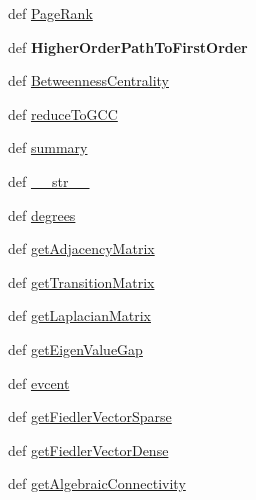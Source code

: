 \begin{DoxyCompactItemize}
\item 
def \hyperlink{classpathpy_1_1HigherOrderNetwork_1_1HigherOrderNetwork_abc76633f53a0747353e7ab0e15744d94}{Page\-Rank}
\item 
\hypertarget{classpathpy_1_1HigherOrderNetwork_1_1HigherOrderNetwork_ab71b78f1c9ffe7a06364841572f1fee2}{def {\bfseries Higher\-Order\-Path\-To\-First\-Order}}\label{classpathpy_1_1HigherOrderNetwork_1_1HigherOrderNetwork_ab71b78f1c9ffe7a06364841572f1fee2}

\item 
def \hyperlink{classpathpy_1_1HigherOrderNetwork_1_1HigherOrderNetwork_afcfdcfacef4f3beb7594a58600e833e4}{Betweenness\-Centrality}
\item 
def \hyperlink{classpathpy_1_1HigherOrderNetwork_1_1HigherOrderNetwork_a4b71eed8268df33814725ae7832729e6}{reduce\-To\-G\-C\-C}
\item 
def \hyperlink{classpathpy_1_1HigherOrderNetwork_1_1HigherOrderNetwork_ab35dd7f65e3bfeb280fcd38c1e7448f7}{summary}
\item 
def \hyperlink{classpathpy_1_1HigherOrderNetwork_1_1HigherOrderNetwork_a4aec883869195967a9209655905ace52}{\-\_\-\-\_\-str\-\_\-\-\_\-}
\item 
def \hyperlink{classpathpy_1_1HigherOrderNetwork_1_1HigherOrderNetwork_acd9ab003f80216ed6beff9c513a7e876}{degrees}
\item 
def \hyperlink{classpathpy_1_1HigherOrderNetwork_1_1HigherOrderNetwork_a8e10f45369dff5f7ccff3bcf7e6c5b33}{get\-Adjacency\-Matrix}
\item 
def \hyperlink{classpathpy_1_1HigherOrderNetwork_1_1HigherOrderNetwork_a20c4a62ca4706bdab81534332e3843fe}{get\-Transition\-Matrix}
\item 
def \hyperlink{classpathpy_1_1HigherOrderNetwork_1_1HigherOrderNetwork_a69ea9c565b0d8bf7f1a2d0cb409f0e15}{get\-Laplacian\-Matrix}
\item 
def \hyperlink{classpathpy_1_1HigherOrderNetwork_1_1HigherOrderNetwork_a556545310735cba27128afd37c59ed35}{get\-Eigen\-Value\-Gap}
\item 
def \hyperlink{classpathpy_1_1HigherOrderNetwork_1_1HigherOrderNetwork_a608108241f9aa06f1027d9ab84f79a65}{evcent}
\item 
def \hyperlink{classpathpy_1_1HigherOrderNetwork_1_1HigherOrderNetwork_aa8f3ed627c16c15c877fc0316c88bdb3}{get\-Fiedler\-Vector\-Sparse}
\item 
def \hyperlink{classpathpy_1_1HigherOrderNetwork_1_1HigherOrderNetwork_adea7800343373793dbd9688c77fb6191}{get\-Fiedler\-Vector\-Dense}
\item 
def \hyperlink{classpathpy_1_1HigherOrderNetwork_1_1HigherOrderNetwork_ae48d8ad635f7cf263897016d876c6fa2}{get\-Algebraic\-Connectivity}
\end{DoxyCompactItemize}
